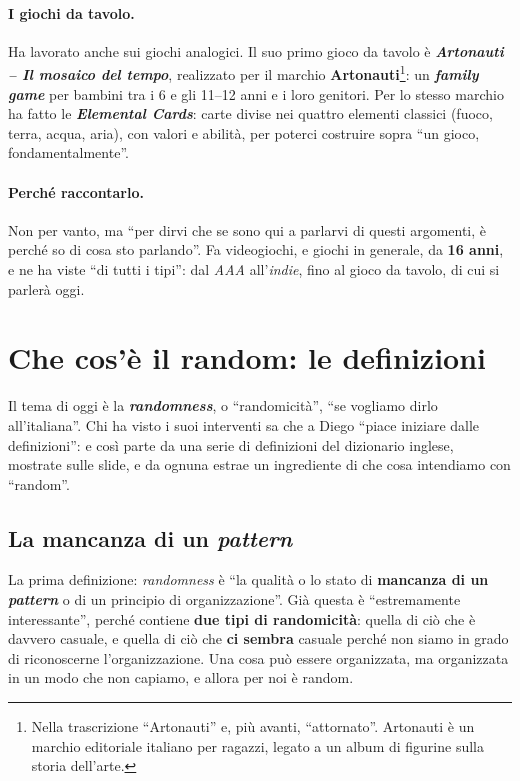 \paragraph{I giochi da tavolo.} Ha lavorato anche sui giochi analogici. Il suo primo gioco
da tavolo è \textbf{\emph{Artonauti -- Il mosaico del tempo}}, realizzato per il marchio
\textbf{Artonauti}\footnote{Nella trascrizione ``Artonauti'' e, più avanti, ``attornato''.
Artonauti è un marchio editoriale italiano per ragazzi, legato a un album di figurine sulla
storia dell'arte.}: un \textbf{\emph{family game}} per bambini tra i 6 e gli 11--12 anni e i
loro genitori. Per lo stesso marchio ha fatto le \textbf{\emph{Elemental Cards}}: carte
divise nei quattro elementi classici (fuoco, terra, acqua, aria), con valori e abilità, per
poterci costruire sopra ``un gioco, fondamentalmente''.

\paragraph{Perché raccontarlo.} Non per vanto, ma ``per dirvi che se sono qui a parlarvi di
questi argomenti, è perché so di cosa sto parlando''. Fa videogiochi, e giochi in generale,
da \textbf{16 anni}, e ne ha viste ``di tutti i tipi'': dal \emph{AAA} all'\emph{indie},
fino al gioco da tavolo, di cui si parlerà oggi.

\section{Che cos'è il random: le definizioni}
\label{a15:sec:definizioni}

Il tema di oggi è la \textbf{\emph{randomness}}, o ``randomicità'', ``se vogliamo dirlo
all'italiana''. Chi ha visto i suoi interventi sa che a Diego ``piace iniziare dalle
definizioni'': e così parte da una serie di definizioni del dizionario inglese, mostrate
sulle slide, e da ognuna estrae un ingrediente di che cosa intendiamo con ``random''.

\subsection{La mancanza di un \emph{pattern}}

La prima definizione: \emph{randomness} è ``la qualità o lo stato di \textbf{mancanza di un
\emph{pattern}} o di un principio di organizzazione''. Già questa è ``estremamente
interessante'', perché contiene \textbf{due tipi di randomicità}: quella di ciò che è
davvero casuale, e quella di ciò che \textbf{ci sembra} casuale perché non siamo in grado di
riconoscerne l'organizzazione. Una cosa può essere organizzata, ma organizzata in un modo
che non capiamo, e allora per noi è random.

